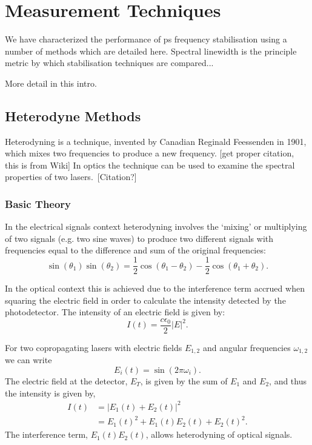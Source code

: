\section{Measurement Techniques}
We have characterized the performance of \gls*{ps} frequency stabilisation using a number of methods which are detailed here. Spectral linewidth is the principle metric by which stabilisation techniques are compared...

{\color{red}More detail in this intro.}

\subsection{Heterodyne Methods}

Heterodyning is a technique, invented by Canadian Reginald Feessenden in 1901, which mixes two frequencies to produce a new frequency. {\color{red} [get proper citation, this is from Wiki]} In optics the technique can be used to examine the spectral properties of two lasers.~{\color{red}[Citation?]}

\subsubsection{Basic Theory}
In the electrical signals context heterodyning involves the `mixing' or multiplying of two signals (e.g. two sine waves) to produce two different signals with frequencies equal to the difference and sum of the original frequencies:
\begin{equation}
\sin(\theta_1)\sin(\theta_2) = \frac{1}{2} \cos(\theta_1-\theta_2) - \frac{1}{2} \cos(\theta_1+\theta_2).
\end{equation}

In the optical context this is achieved due to the interference term accrued when squaring the electric field in order to calculate the intensity detected by the photodetector. The intensity of an electric field is given by:
\begin{equation}
I(t) = \frac{c\epsilon_0}{2}|E|^2.
\end{equation}

For two copropagating lasers with electric fields $E_{1, 2}$ and angular frequencies $\omega_{1, 2}$ we can write
\begin{equation}
E_{i}(t) = \sin(2\pi \omega_{i}).
\end{equation}
The electric field at the detector, $E_T$, is given by the sum of $E_{1}$ and $E_{2}$, and thus the intensity is given by,
\begin{align}
I(t) &= |E_1(t) + E_2(t)|^2\nonumber\\
&= E_1(t)^2 + E_1(t)E_2(t) + E_2(t)^2.
\end{align}
The interference term, $E_1(t)E_2(t)$, allows heterodyning of optical signals.

